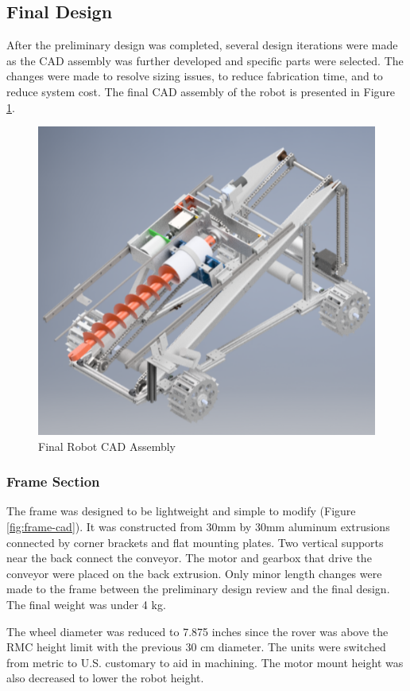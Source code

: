 \documentclass[class=article, crop=false]{standalone}
\begin{document}
	\subsection{Final Design}
	\label{subsec:final-design}
	
	After the preliminary design was completed, several design iterations were made as the CAD assembly was further developed and specific parts were selected. The changes were made to resolve sizing issues, to reduce fabrication time, and to reduce system cost. The final CAD assembly of the robot is presented in Figure \ref{fig:final-cad}.
	
	\FloatBarrier
	\begin{figure}[h]
	\centering
	 \includegraphics[width=0.5\linewidth]{09_Figures/final-cad.jpg}
	 \caption{Final Robot CAD Assembly}
	 \label{fig:final-cad}
	\end{figure}
	\FloatBarrier
	
	\subsubsection{Frame Section}
	
	The frame was designed to be lightweight and simple to modify (Figure \ref{fig:frame-cad}). It was constructed from 30mm by 30mm aluminum extrusions connected by corner brackets and flat mounting plates. Two vertical supports near the back connect the conveyor. The motor and gearbox that drive the conveyor were placed on the back extrusion. Only minor length changes were made to the frame between the preliminary design review and the final design. The final weight was under 4 kg.
	
	The wheel diameter was reduced to 7.875 inches since the rover was above the RMC height limit with the previous 30 cm diameter. The units were switched from metric to U.S. customary to aid in machining. The motor mount height was also decreased to lower the robot height.
\end{document}
